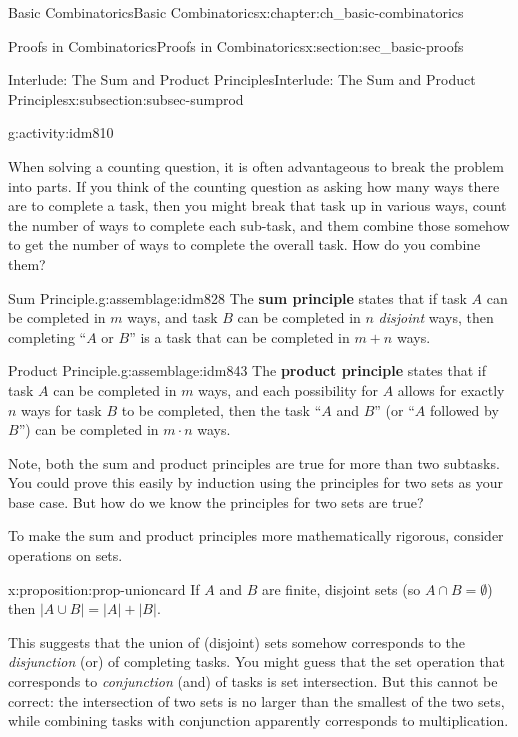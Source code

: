 \documentclass[oneside,10pt,]{book}
\newcommand{\terminology}[1]{\textbf{#1}}
\numberwithin{equation}{chapter}
\newcommand{\card}[1]{\left| #1 \right|}
\begin{document}
\begin{chapterptx}{Basic Combinatorics}{}{Basic Combinatorics}{}{}{x:chapter:ch_basic-combinatorics}
\begin{sectionptx}{Proofs in Combinatorics}{}{Proofs in Combinatorics}{}{}{x:section:sec_basic-proofs}
\begin{subsectionptx}{Interlude: The Sum and Product Principles}{}{Interlude: The Sum and Product Principles}{}{}{x:subsection:subsec-sumprod}
\begin{activity}{}{g:activity:idm810}
\begin{enumerate}[font=\bfseries,label=(\alph*),ref=\alph*]
\begin{enumerate}
\end{enumerate}
%
\end{enumerate}
\end{activity}
When solving a counting question, it is often advantageous to break the problem into parts.  If you think of the counting question as asking how many ways there are to complete a task, then you might break that task up in various ways, count the number of ways to complete each sub-task, and them combine those somehow to get the number of ways to complete the overall task.  How do you combine them?%
\begin{assemblage}{Sum Principle.}{g:assemblage:idm828}%
The \terminology{sum principle} states that if task \(A\) can be completed in \(m\) ways, and task \(B\) can be completed in \(n\) \emph{disjoint} ways, then completing ``\(A\) or \(B\)'' is a task that can be completed in \(m + n\) ways.%
\end{assemblage}
\begin{assemblage}{Product Principle.}{g:assemblage:idm843}%
The \terminology{product principle} states that if task \(A\) can be completed in \(m\) ways, and each possibility for \(A\) allows for exactly \(n\) ways for task \(B\) to be completed, then the task ``\(A\) and \(B\)'' (or ``\(A\) followed by \(B\)'') can be completed in \(m \cdot n\) ways.%
\end{assemblage}
Note, both the sum and product principles are true for more than two subtasks.  You could prove this easily by induction using the principles for two sets as your base case.  But how do we know the principles for two sets are true?%
\par
To make the sum and product principles more mathematically rigorous, consider operations on sets.%
\begin{proposition}{}{}{x:proposition:prop-unioncard}%
If \(A\) and \(B\) are finite, disjoint sets (so \(A \cap B = \emptyset\)) then \(\card{A \cup B} = \card{A} + \card{B}\).%
\end{proposition}
This suggests that the union of (disjoint) sets somehow corresponds to the \emph{disjunction} (or) of completing tasks.  You might guess that the set operation that corresponds to \emph{conjunction} (and) of tasks is set intersection.  But this cannot be correct: the intersection of two sets is no larger than the smallest of the two sets, while combining tasks with conjunction apparently corresponds to multiplication.%
\par

\end{subsectionptx}
\end{sectionptx}
\end{chapterptx}
\end{document}

